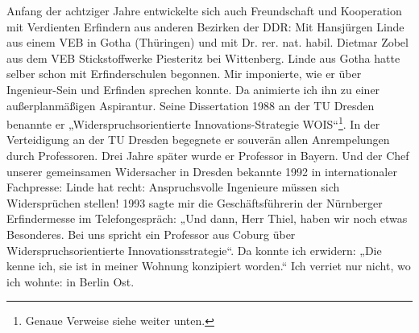 \documentclass[12pt,a4paper]{article}
\begin{document}
Anfang der achtziger Jahre entwickelte sich auch Freundschaft und Kooperation
mit Verdienten Erfindern aus anderen Bezirken der DDR: Mit Hansjürgen Linde
aus einem VEB in Gotha (Thüringen) und mit Dr. rer. nat. habil. Dietmar Zobel
aus dem VEB Stickstoffwerke Piesteritz bei Wittenberg. Linde aus Gotha hatte
selber schon mit Erfinderschulen begonnen. Mir imponierte, wie er über
Ingenieur-Sein und Erfinden sprechen konnte. Da animierte ich ihn zu einer
außerplanmäßigen Aspirantur. Seine Dissertation 1988 an der TU Dresden
benannte er „Widerspruchsorientierte Innovations-Strategie
WOIS“\footnote{Genaue Verweise siehe weiter unten.}. In der Verteidigung an
der TU Dresden begegnete er souverän allen Anrempelungen durch Professoren.
Drei Jahre später wurde er Professor in Bayern. Und der Chef unserer
gemeinsamen Widersacher in Dresden bekannte 1992 in internationaler
Fachpresse: Linde hat recht: Anspruchsvolle Ingenieure müssen sich
Widersprüchen stellen! 1993 sagte mir die Geschäftsführerin der Nürnberger
Erfindermesse im Telefongespräch: „Und dann, Herr Thiel, haben wir noch etwas
Besonderes. Bei uns spricht ein Professor aus Coburg über
Widerspruchsorientierte Innovationsstrategie“. Da konnte ich erwidern: „Die
kenne ich, sie ist in meiner Wohnung konzipiert worden.“ Ich verriet nur
nicht, wo ich wohnte: in Berlin Ost.
\end{document}
